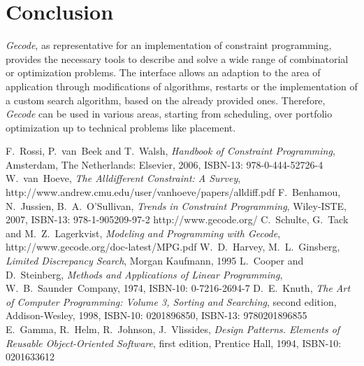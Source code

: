 \documentclass[10pt,
               a4paper,
               journal,
               ]{IEEEtran}
\begin{document}
	\section{Conclusion}
	\emph{Gecode}, as representative for an implementation of constraint programming, provides the necessary tools to describe and solve a wide range of combinatorial or optimization problems. The interface allows an adaption to the area of application through modifications of algorithms, restarts or the implementation of a custom search algorithm, based on the already provided ones. Therefore, \emph{Gecode} can be used in various areas, starting from scheduling, over portfolio optimization up to technical problems like placement.
	
	\begin{thebibliography}{1}
		F.~Rossi, P.~van~Beek and T.~Walsh, \emph{Handbook of Constraint Programming}, Amsterdam, The Netherlands: Elsevier, 2006, ISBN-13: 978-0-444-52726-4
		W.~van~Hoeve, \emph{The Alldifferent Constraint: A Survey}, http://www.andrew.cmu.edu/user/vanhoeve/papers/alldiff.pdf
		F.~Benhamou, N.~Jussien, B.~A.~O'Sullivan, \emph{Trends in Constraint Programming}, Wiley-ISTE, 2007, ISBN-13: 978-1-905209-97-2
		http://www.gecode.org/
		C.~Schulte, G.~Tack and M.~Z.~Lagerkvist, \emph{Modeling and Programming with Gecode}, http://www.gecode.org/doc-latest/MPG.pdf
		W.~D.~Harvey, M.~L.~Ginsberg, \emph{Limited Discrepancy Search}, Morgan Kaufmann, 1995
		L.~Cooper and D.~Steinberg, \emph{Methods and Applications of Linear Programming}, W.~B.~Saunder~Company, 1974, ISBN-10: 0-7216-2694-7
		D.~E.~Knuth, \emph{The Art of Computer Programming: Volume 3, Sorting and Searching}, second edition, Addison-Wesley, 1998, ISBN-10: 0201896850, ISBN-13: 9780201896855
		E.~Gamma, R.~Helm, R.~Johnson, J.~Vlissides, \emph{Design Patterns. Elements of Reusable Object-Oriented Software}, first edition, Prentice Hall, 1994, ISBN-10: 0201633612
	\end{thebibliography}
\end{document}
